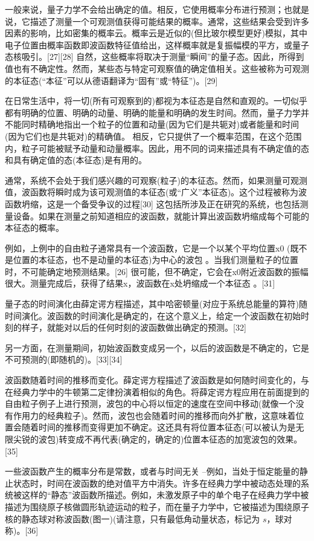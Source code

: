 一般来说，量子力学不会给出确定的值。相反，它使用概率分布进行预测；也就是说，它描述了测量一个可观测值获得可能结果的概率。通常，这些结果会受到许多因素的影响，比如密集的概率云。概率云是近似的(但比玻尔模型更好)模拟，其中电子位置由概率函数即波函数特征值给出，这样概率就是复振幅模的平方，或量子态核吸引。[27][28] 自然，这些概率将取决于测量“瞬间”的量子态。因此，所得到值也有不确定性。然而，某些态与特定可观察值的确定值相关。这些被称为可观测的本征态(“本征”可以从德语翻译为“固有”或“特征”)。[29]

在日常生活中，将一切(所有可观察到的)都视为本征态是自然和直观的。一切似乎都有明确的位置、明确的动量、明确的能量和明确的发生时间。然而，量子力学并不能同时精确地指出一个粒子的位置和动量(因为它们是共轭对)或者能量和时间(因为它们也是共轭对)的精确值。 相反，它只提供了一个概率范围，在这个范围内，粒子可能被赋予动量和动量概率。因此，用不同的词来描述具有不确定值的态和具有确定值的态(本征态)是有用的。

通常，系统不会处于我们感兴趣的可观察(粒子)的本征态。然而，如果测量可观测值，波函数将瞬时成为该可观测值的本征态(或“广义”本征态)。这个过程被称为波函数坍缩，这是一个备受争议的过程[30] 这包括所涉及正在研究的系统，也包括测量设备。如果在测量之前知道相应的波函数，就能计算出波函数坍缩成每个可能的本征态的概率。

例如，上例中的自由粒子通常具有一个波函数，它是一个以某个平均位置x0 (既不是位置的本征态，也不是动量的本征态)为中心的波包 。当我们测量粒子的位置时，不可能确定地预测结果。[26] 很可能，但不确定，它会在x0附近波函数的振幅很大。测量完成后，获得了结果x，波函数在x处坍缩成一个本征态 。[31]

量子态的时间演化由薛定谔方程描述，其中哈密顿量(对应于系统总能量的算符)随时间演化。波函数的时间演化是确定的，在这个意义上，给定一个波函数在初始时刻的样子，就能对以后的任何时刻的波函数做出确定的预测。[32]

另一方面，在测量期间，初始波函数变成另一个，以后的波函数是不确定的，它是不可预测的(即随机的)。[33][34]

波函数随着时间的推移而变化。薛定谔方程描述了波函数是如何随时间变化的，与在经典力学中的牛顿第二定律扮演着相似的角色。将薛定谔方程应用在前面提到的自由粒子例子上进行预测，波包的中心将以恒定的速度在空间中移动(就像一个没有作用力的经典粒子)。然而，波包也会随着时间的推移而向外扩散，这意味着位置会随着时间的推移而变得更加不确定。这还具有将位置本征态(可以被认为是无限尖锐的波包)转变成不再代表(确定的，确定的)位置本征态的加宽波包的效果。[35]

一些波函数产生的概率分布是常数，或者与时间无关 –例如，当处于恒定能量的静止状态时，时间在波函数的绝对值平方中消失。许多在经典力学中被动态处理的系统被这样的“静态”波函数所描述。例如，未激发原子中的单个电子在经典力学中被描述为围绕原子核做圆形轨迹运动的粒子，而在量子力学中，它被描述为围绕原子核的静态球对称波函数(图一)(请注意，只有最低角动量状态，标记为 $s$，球对称)。[36]

